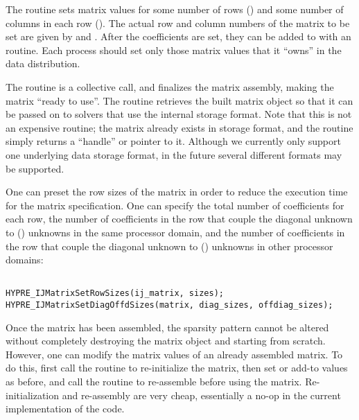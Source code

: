The  routine sets matrix values for some number of
rows () and some number of columns in each row
().  The actual row and column numbers of the matrix
 to be set are given by  and .
After the coefficients are set, they can be added to with an
 routine.  Each process should set only those matrix
values that it ``owns'' in the data distribution.

The  routine is a collective call, and finalizes the
matrix assembly, making the matrix ``ready to use''.  The
 routine retrieves the built matrix object so that
it can be passed on to \hypre{} solvers that use the 
internal storage format.  Note that this is not an expensive routine;
the matrix already exists in  storage format, and the
routine simply returns a ``handle'' or pointer to it.  Although we
currently only support one underlying data storage format, in the
future several different formats may be supported.

One can preset the row sizes of the matrix in order to reduce the
execution time for the matrix specification.  One can specify the
total number of coefficients for each row, the number of coefficients
in the row that couple the diagonal unknown to () unknowns
in the same processor domain, and the number of coefficients in the
row that couple the diagonal unknown to () unknowns in
other processor domains:

\begin{display}
\begin{verbatim}

HYPRE_IJMatrixSetRowSizes(ij_matrix, sizes);
HYPRE_IJMatrixSetDiagOffdSizes(matrix, diag_sizes, offdiag_sizes);

\end{verbatim}
\end{display}

Once the matrix has been assembled, the sparsity pattern cannot be
altered without completely destroying the matrix object and starting
from scratch.  However, one can modify the matrix values of an already
assembled matrix.  To do this, first call the 
routine to re-initialize the matrix, then set or add-to values as
before, and call the  routine to re-assemble before
using the matrix.  Re-initialization and re-assembly are very cheap,
essentially a no-op in the current implementation of the code.

